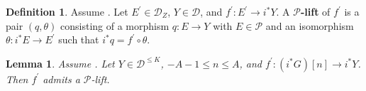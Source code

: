 \documentclass[11pt]{amsart}
\theoremstyle{plain}
\newtheorem{lemma}[theorem]{Lemma}
\theoremstyle{definition}
\newtheorem{definition}[theorem]{Definition}
\numberwithin{equation}{section}
\numberwithin{theorem}{section}
\begin{document}
\begin{definition}
    \label{def:lift}
    Assume . 
    Let $E^\prime \in \mathcal{D}_Z$, $Y\in \mathcal{D}$, and $f^\prime \colon E^\prime \to i^\ast Y$.
    A \textbf{$\mathcal{P}$-lift} of $f^\prime$ is a pair $(q,\theta)$ consisting of a morphism $q\colon E\to Y$ with $E\in \mathcal{P}$ and an isomorphism $\theta\colon i^\ast E \to E^\prime$ such that $i^\ast q = f^\prime \circ \theta$.
\end{definition}

\begin{lemma}
    \label{lem:onecell}
    Assume . 
    Let $Y\in \mathcal{D}^{\leq K}$, $-A-1\leq n\leq A$, and $f^\prime \colon (i^\ast G)[n]\to i^\ast Y$.
    Then $f^\prime$ admits a $\mathcal{P}$-lift.
\end{lemma}
\end{document}
